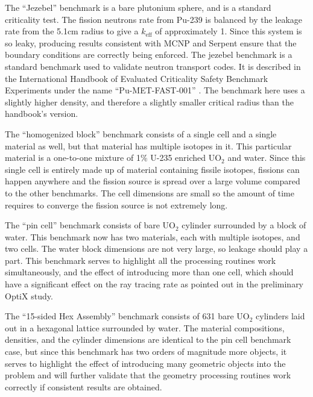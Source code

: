 The ``Jezebel'' benchmark is a bare plutonium sphere, and is a standard criticality test.   The fission neutrons rate from Pu-239 is balanced by the leakage rate from the 5.1cm radius to give a $k_\mathrm{eff}$ of approximately 1.  Since this system is so leaky, producing results consistent with MCNP and Serpent ensure that the boundary conditions are correctly being enforced.  The jezebel benchmark is a standard benchmark used to validate neutron transport codes.  It is described in the International Handbook of Evaluated Criticality Safety Benchmark Experiments under the name ``Pu-MET-FAST-001'' \cite{bench_handbook}.  The benchmark here uses a slightly higher density, and therefore a slightly smaller critical radius than the handbook's version.

The ``homogenized block'' benchmark consists of a single cell and a single material as well, but that material has multiple isotopes in it.  This particular material is a one-to-one mixture of 1\% U-235 enriched UO$_2$ and water.  Since this single cell is entirely made up of material containing fissile isotopes, fissions can happen anywhere and the fission source is spread over a large volume compared to the other benchmarks.  The cell dimensions are small so the amount of time requires to converge the fission source is not extremely long.

The ``pin cell'' benchmark consists of bare UO$_2$ cylinder surrounded by a block of water.  This benchmark now has two materials, each with multiple isotopes, and two cells.  The water block dimensions are not very large, so leakage should play a part.  This benchmark serves to highlight all the processing routines work simultaneously, and the effect of introducing more than one cell, which should have a significant effect on the ray tracing rate as pointed out in the preliminary OptiX study.

The ``15-sided Hex Assembly'' benchmark consists of 631 bare UO$_2$ cylinders laid out in a hexagonal lattice surrounded by water.  The material compositions, densities, and the cylinder dimensions are identical to the pin cell benchmark case, but since this benchmark has two orders of magnitude more objects, it serves to highlight the effect of introducing many geometric objects into the problem and will further validate that the geometry processing routines work correctly if consistent results are obtained.

